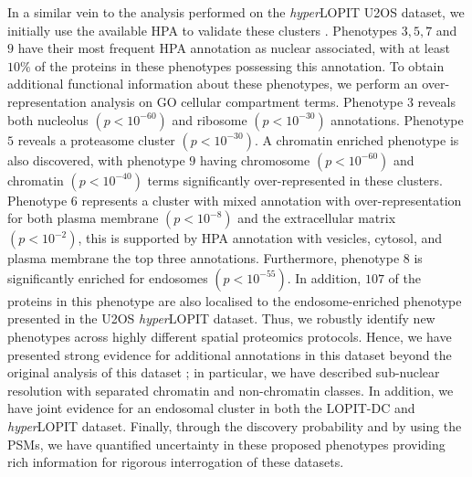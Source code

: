 \documentclass[12pt,english]{article}
\begin{document}
 In a similar vein to the analysis performed on the \textit{hyper}LOPIT U2OS dataset, we initially use the available HPA to validate these clusters \citep{Thul:2017}. Phenotypes $3,5,7$ and $9$ have their most frequent HPA annotation as nuclear associated, with at least $10\%$ of the proteins in these phenotypes possessing this annotation. To obtain additional functional information about these phenotypes, we perform an over-representation analysis on GO cellular compartment terms. Phenotype $3$ reveals both nucleolus $(p < 10^{-60})$ and ribosome $(p < 10^{-30})$ annotations. Phenotype $5$ reveals a proteasome cluster $(p < 10^{-30})$. A chromatin enriched phenotype is also discovered, with phenotype $9$ having chromosome $(p < 10^{-60})$ and chromatin $(p < 10^{-40})$ terms significantly over-represented in these clusters. Phenotype $6$ represents a cluster with mixed annotation with over-representation for both plasma membrane $(p < 10^{-8})$ and the extracellular matrix $(p < 10^{-2})$, this is supported by HPA annotation with vesicles, cytosol, and plasma membrane the top three annotations. Furthermore, phenotype $8$ is significantly enriched for endosomes $(p < 10^{-55})$. In addition, $107$ of the proteins in this phenotype are also localised to the endosome-enriched phenotype presented in the U2OS \textit{hyper}LOPIT dataset. Thus, we robustly identify new phenotypes across highly different spatial proteomics protocols. Hence, we have presented strong evidence for additional annotations in this dataset beyond the original analysis of this dataset \citep{DC:2018}; in particular, we have described sub-nuclear resolution with separated chromatin and non-chromatin classes. In addition, we have joint evidence for an endosomal cluster in both the LOPIT-DC and \textit{hyper}LOPIT dataset. Finally, through the discovery probability and by using the PSMs, we have quantified uncertainty in these proposed phenotypes providing rich information for rigorous interrogation of these datasets.
 
\end{document}
